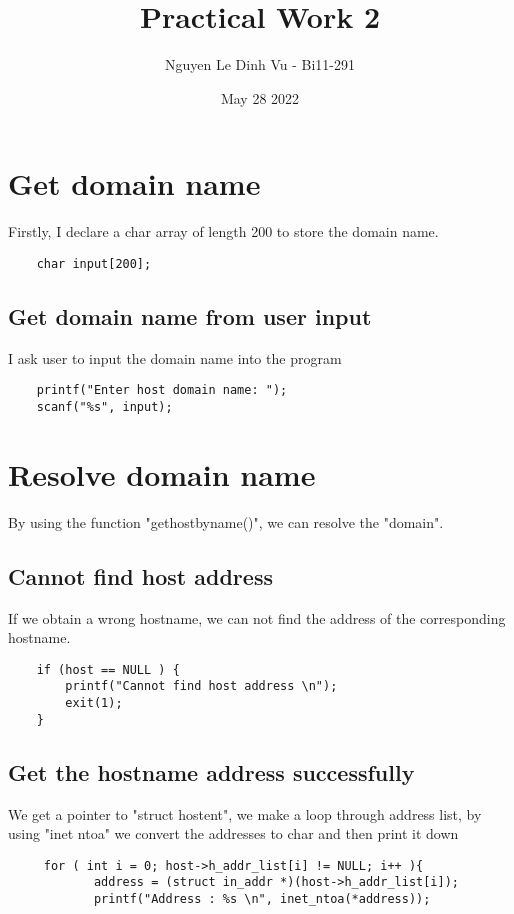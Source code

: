 \documentclass[12pt]{article}
\begin{document}


\begin{titlepage}
    \title{\textbf{\LARGE{Practical Work 2}}}
    \author{\LARGE{Nguyen Le Dinh Vu - Bi11-291 }}
    \date{May 28 2022}
    
\end{titlepage}
\newpage

\maketitle

\section{Get domain name}
Firstly, I declare a char array of length 200 to store the domain name.
\begin{verbatim}
    char input[200];
\end{verbatim}

\subsection{Get domain name from user input}
I ask user to input the domain name into the program
\begin{verbatim}
    printf("Enter host domain name: ");
    scanf("%s", input);
\end{verbatim}


\section{Resolve domain name}
By using the function "gethostbyname()", we can resolve the "domain".

\subsection{Cannot find host address}
If we obtain a wrong hostname, we can not find the address of the corresponding hostname.
\begin{verbatim}
    if (host == NULL ) {
        printf("Cannot find host address \n");
        exit(1);
    }
\end{verbatim}
\subsection{Get the hostname address successfully}
We get a pointer to "struct hostent", we make a loop through address list, by using "inet ntoa" we convert the addresses to char and then print it down
\begin{verbatim}
     for ( int i = 0; host->h_addr_list[i] != NULL; i++ ){
        	address = (struct in_addr *)(host->h_addr_list[i]);
        	printf("Address : %s \n", inet_ntoa(*address));
\end{verbatim}
\end{document}
